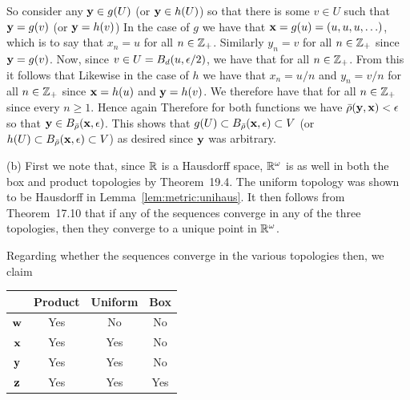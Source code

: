 {{    So consider any $\mathbf{y} \in g(U)$ (or $\mathbf{y} \in h(U)$) so that there is some $v \in U$ such that $\mathbf{y} = g(v)$ (or $\mathbf{y} = h(v)$)
    In the case of $g$ we have that $\mathbf{x} = g(u) = (u,u,u,\ldots)$, which is to say that $x_n = u$ for all $n \in {{\mathbb{Z}}_+}$.
    Similarly $y_n = v$ for all $n \in {{\mathbb{Z}}_+}$ since $\mathbf{y} = g(v)$.
    Now, since $v \in U = B_d(u,\epsilon/2)$, we have that
    for all $n \in {{\mathbb{Z}}_+}$.
    From this it follows that
    Likewise in the case of $h$ we have that $x_n = u/n$ and $y_n = v/n$ for all $n \in {{\mathbb{Z}}_+}$ since $\mathbf{x} = h(u)$ and $\mathbf{y} = h(v)$.
    We therefore have that
    for all $n \in {{\mathbb{Z}}_+}$ since every $n \geq 1$.
    Hence again
    Therefore for both functions we have $\bar{\rho}(\mathbf{y}, \mathbf{x}) < \epsilon$ so that $\mathbf{y} \in B_{\bar{\rho}}(\mathbf{x}, \epsilon)$.
    This shows that $g(U) \subset B_{\bar{\rho}}(\mathbf{x}, \epsilon) \subset V$ (or $h(U) \subset B_{\bar{\rho}}(\mathbf{x}, \epsilon) \subset V$) as desired since $\mathbf{y}$ was arbitrary.
  }

  (b) First we note that, since ${\mathbb{R}}$ is a Hausdorff space, ${\mathbb{R}}^\omega$ is as well in both the box and product topologies by Theorem~19.4.
  The uniform topology was shown to be Hausdorff in Lemma~\ref{lem:metric:unihaus}.
  It then follows from Theorem~17.10 that if any of the sequences converge in any of the three topologies, then they converge to a unique point in ${\mathbb{R}}^\omega$.

  Regarding whether the sequences converge in the various topologies then, we claim
    \begin{center}
    \begin{tabular}{c|ccc}
      & Product & Uniform & Box \\
      \hline
      $\mathbf{w}$ & Yes & No & No \\
      $\mathbf{x}$ & Yes & Yes & No \\
      $\mathbf{y}$ & Yes & Yes & No \\
      $\mathbf{z}$ & Yes & Yes & Yes
    \end{tabular}
  \end{center}
  }
